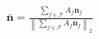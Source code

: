 $\bar{\mathbf{n}}=
    \frac{\sum_{f\in\mathcal{F}} A_f\mathbf{n}_f}
    {\left\|\sum_{f\in\mathcal{F}} A_f\mathbf{n}_f\right\|_2}$